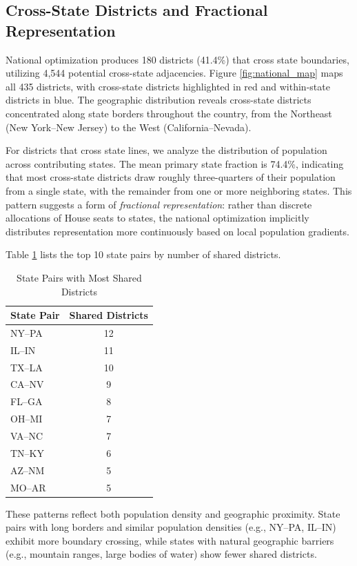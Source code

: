 \subsection{Cross-State Districts and Fractional Representation}

National optimization produces 180 districts (41.4\%) that cross state boundaries, utilizing 4,544 potential cross-state adjacencies. Figure \ref{fig:national_map} maps all 435 districts, with cross-state districts highlighted in red and within-state districts in blue. The geographic distribution reveals cross-state districts concentrated along state borders throughout the country, from the Northeast (New York--New Jersey) to the West (California--Nevada).

For districts that cross state lines, we analyze the distribution of population across contributing states. The mean primary state fraction is 74.4\%, indicating that most cross-state districts draw roughly three-quarters of their population from a single state, with the remainder from one or more neighboring states. This pattern suggests a form of \textit{fractional representation}: rather than discrete allocations of House seats to states, the national optimization implicitly distributes representation more continuously based on local population gradients.

Table \ref{tab:cross_state_top10} lists the top 10 state pairs by number of shared districts.

\begin{table}[h]
\centering
\caption{State Pairs with Most Shared Districts}
\label{tab:cross_state_top10}
\begin{tabular}{lc}
\toprule
\textbf{State Pair} & \textbf{Shared Districts} \\
\midrule
NY--PA & 12 \\
IL--IN & 11 \\
TX--LA & 10 \\
CA--NV & 9 \\
FL--GA & 8 \\
OH--MI & 7 \\
VA--NC & 7 \\
TN--KY & 6 \\
AZ--NM & 5 \\
MO--AR & 5 \\
\bottomrule
\end{tabular}
\end{table}

These patterns reflect both population density and geographic proximity. State pairs with long borders and similar population densities (e.g., NY--PA, IL--IN) exhibit more boundary crossing, while states with natural geographic barriers (e.g., mountain ranges, large bodies of water) show fewer shared districts.

